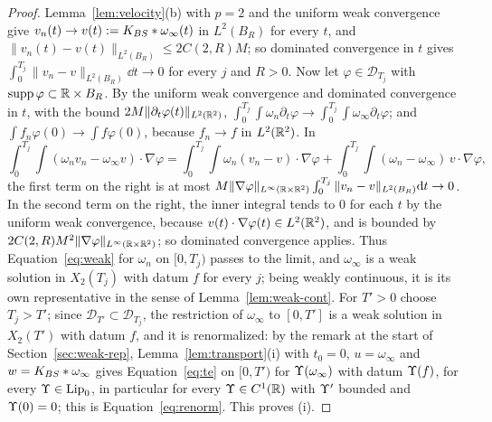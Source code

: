 \begin{proof}
Lemma~\ref{lem:velocity}(b) with $p=2$ and the uniform weak convergence give
$v_n(t)\to v(t):=K_{BS}\ast\omega_\infty(t)$ in $L^2(B_R)$ for every $t$, and
$\|v_n(t)-v(t)\|_{L^2(B_R)}\le2C(2,R)M$; so dominated convergence in $t$ gives
$\int_0^{T_j}\|v_n-v\|_{L^2(B_R)}\dd t\to0$ for every $j$ and $R>0$. Now let
$\varphi\in\mathcal D_{T_j}$ with $\operatorname{supp}\varphi\subset\mathbb{R}\times B_R$. By the
uniform weak convergence and dominated convergence in $t$, with the bound
$2M\|\partial_t\varphi(t)\|_{L^2(\mathbb{R}^2)}$,
$\int_0^{T_j}\!\int\omega_n\partial_t\varphi\to\int_0^{T_j}\!\int\omega_\infty\partial_t\varphi$;
and $\int f_n\varphi(0)\to\int f\varphi(0)$, because $f_n\to f$ in $L^2(\mathbb{R}^2)$. In
\[
\int_0^{T_j}\!\!\int(\omega_nv_n-\omega_\infty v)\cdot\nabla\varphi
=\int_0^{T_j}\!\!\int\omega_n(v_n-v)\cdot\nabla\varphi
+\int_0^{T_j}\!\!\int(\omega_n-\omega_\infty)\,v\cdot\nabla\varphi ,
\]
the first term on the right is at most
$M\|\nabla\varphi\|_{L^\infty(\mathbb{R}\times\mathbb{R}^2)}\int_0^{T_j}\|v_n-v\|_{L^2(B_R)}\dd t\to0$.
In the second term on the right, the inner integral tends to $0$ for each $t$ by the uniform weak
convergence, because $v(t)\cdot\nabla\varphi(t)\in L^2(\mathbb{R}^2)$, and is bounded by
$2C(2,R)M^2\|\nabla\varphi\|_{L^\infty(\mathbb{R}\times\mathbb{R}^2)}$; so dominated convergence applies.
Thus Equation~\eqref{eq:weak} for $\omega_n$ on $[0,T_j)$ passes to the limit,
and $\omega_\infty$ is a weak solution in $X_2(T_j)$ with datum $f$ for every
$j$; being weakly continuous, it is its own representative in the sense of
Lemma~\ref{lem:weak-cont}. For $T'>0$ choose $T_j>T'$; since
$\mathcal D_{T'}\subset\mathcal D_{T_j}$, the restriction of $\omega_\infty$ to
$[0,T']$ is a weak solution in $X_2(T')$ with datum $f$, and it is
renormalized: by the remark at the start of Section~\ref{sec:weak-rep},
Lemma~\ref{lem:transport}(i) with $t_0=0$, $u=\omega_\infty$ and
$w=K_{BS}\ast\omega_\infty$ gives Equation~\eqref{eq:te} on $[0,T')$ for
$\Upsilon(\omega_\infty)$ with datum $\Upsilon(f)$, for every $\Upsilon\in\mathrm{Lip}_0$, in
particular for every $\Upsilon\in C^1(\mathbb{R})$ with $\Upsilon'$ bounded and $\Upsilon(0)=0$;
this is Equation~\eqref{eq:renorm}. This proves (i).


\end{proof}
